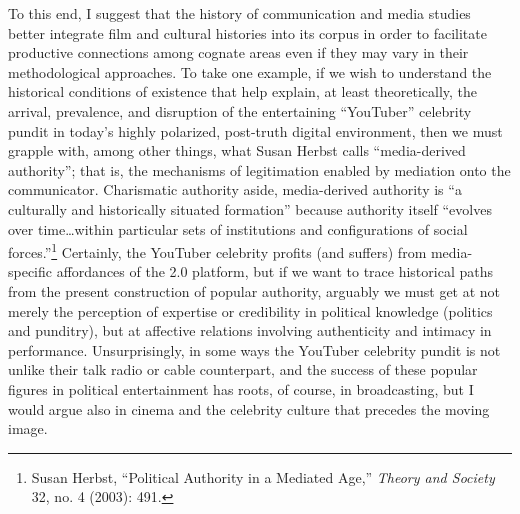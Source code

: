 \documentclass{tufte-handout}
\begin{document}
To this end, I suggest that the history of communication and media
studies better integrate film and cultural histories into its corpus in
order to facilitate productive connections among cognate areas even if
they may vary in their methodological approaches. To take one example,
if we wish to understand the historical conditions of existence that
help explain, at least theoretically, the arrival, prevalence, and
disruption of the entertaining ``YouTuber'' celebrity pundit in today's
highly polarized, post-truth digital environment, then we must grapple
with, among other things, what Susan Herbst calls ``media-derived
authority''; that is, the mechanisms of legitimation enabled by
mediation onto the communicator. Charismatic authority aside,
media-derived authority is ``a culturally and historically situated
formation'' because authority itself ``evolves over time\ldots within
particular sets of institutions and configurations of social
forces.''\footnote{Susan Herbst, ``Political Authority in a Mediated
  Age,'' \emph{Theory and Society} 32, no. 4 (2003): 491.} Certainly,
the YouTuber celebrity profits (and suffers) from media-specific
affordances of the 2.0 platform, but if we want to trace historical
paths from the present construction of popular authority, arguably we
must get at not merely the perception of expertise or credibility in
political knowledge (politics and punditry), but at affective relations
involving authenticity and intimacy in performance. Unsurprisingly, in
some ways the YouTuber celebrity pundit is not unlike their talk radio
or cable counterpart, and the success of these popular figures in
political entertainment has roots, of course, in broadcasting, but I
would argue also in cinema and the celebrity culture that precedes the
moving image.
\end{document}

